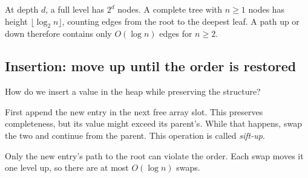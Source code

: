 \documentclass[a4paper,12pt,oneside]{report}
\begin{document}
At depth $d$, a full level has $2^d$ nodes. A complete tree with
$n\geq1$ nodes has height $\lfloor\log_2 n\rfloor$, counting
edges from the root to the deepest leaf. A path up or down therefore
contains only $O(\log n)$ edges for $n\geq2$.

\subsection{Insertion: move up until the order is restored}

How do we insert a value in the heap while preserving the structure?

First append the new entry in the next free array slot. This
preserves completeness, but its value might exceed its parent's.
While that happens, swap the two and continue from the parent.
This operation is called \emph{sift-up}.

Only the new entry's path to the root can violate the order. Each
swap moves it one level up, so there are at most $O(\log n)$ swaps.
\end{document}
